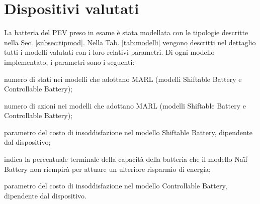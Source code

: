\documentclass[italian, Lau, oneside]{sapthesis}
\begin{document}
\section{Dispositivi valutati}
La batteria del PEV preso in esame è stata modellata con le tipologie descritte nella Sec. \ref{subsec:tipmod}. Nella Tab. \ref{tab:modelli} vengono descritti nel dettaglio tutti i modelli valutati con i loro relativi parametri. Di ogni modello implementato, i parametri sono i seguenti:
\begin{description}
\addtolength{\itemindent}{0.5cm}
    \item [\# stati] numero di stati nei modelli che adottano MARL (modelli Shiftable Battery e Controllable Battery);
    \item [\# azioni] numero di azioni nei modelli che adottano MARL (modelli Shiftable Battery e Controllable Battery);
    \item [$\mathbf{\kappa}$] parametro del costo di insoddisfazione nel modello Shiftable Battery, dipendente dal dispositivo;
    \item [deficit] indica la percentuale terminale della capacità della batteria che il modello Naïf Battery non riempirà per attuare un ulteriore risparmio di energia;
    \item [$\mathbf{\beta}$] parametro del costo di insoddisfazione nel modello Controllable Battery, dipendente dal dispositivo.
\end{description}
\end{document}
